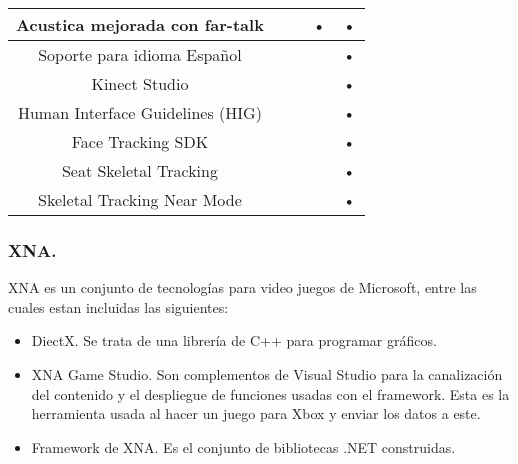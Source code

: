 \documentclass[11pt,a4paper]{article}
\begin{document}
\begin{tabular}{||c||c||c||c||c||}
\hline Acustica mejorada con far-talk           &        &        & •         & •           \\  
\hline Soporte para idioma Español              &        &        &           & •           \\ 
\hline Kinect Studio                            &        &        &           & •           \\ 
\hline Human Interface Guidelines (HIG)         &        &        &           & •           \\ 
\hline Face Tracking SDK                        &        &        &           & •           \\ 
\hline Seat Skeletal Tracking                   &        &        &           & •           \\ 
\hline Skeletal Tracking Near Mode              &        &        &           & •           \\ 
\hline 
\end{tabular} 

\subsubsection{XNA.}
XNA es un conjunto de tecnologías para video juegos de Microsoft, entre las cuales estan incluidas las siguientes: 
\begin{itemize}
\item DiectX. Se trata de una librería de C++ para programar gráficos.
\item XNA Game Studio. Son complementos de Visual Studio para la canalización del contenido y el despliegue de funciones usadas con el framework. Esta es la herramienta usada al hacer un juego para Xbox y enviar los datos a este.
\item Framework de XNA. Es el conjunto de bibliotecas .NET construidas.
\end{itemize}
\end{document}
